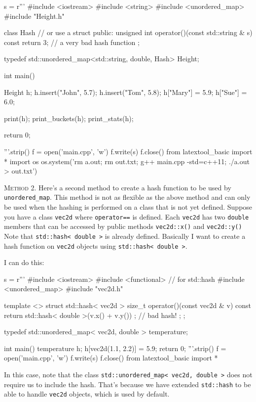 \begin{python}
s = r'''
#include <iostream>
#include <string>
#include <unordered_map>
#include "Height.h"

class Hash // or use a struct
{
public:
    unsigned int operator()(const std::string & s) const
    {
        return 3; // a very bad hash function
    }
};

typedef std::unordered_map<std::string, double, Hash> Height;

int main()
{
    Height h;
    h.insert({"John", 5.7});
    h.insert({"Tom", 5.8});
    h["Mary"] = 5.9;
    h["Sue"] = 6.0;

    print(h);
    print_buckets(h);
    print_stats(h);
              
    return 0;
}
'''.strip()
f = open('main.cpp', 'w')
f.write(s)
f.close()
from latextool_basic import *
import os
os.system('rm a.out; rm out.txt; g++ main.cpp -std=c++11; ./a.out > out.txt')
\end{python}
\vspace{-0.1cm}
{\small
{}
}

\textsc{Method 2.}
Here's a second method to create a hash function to be used
by \verb!unordered_map!.
This method is not as flexible as the above method
and can only be used when the hashing is performed
on a class that is not yet defined.
Suppose you have a class \verb!vec2d!
where \verb!operator==! is defined.
Each \verb!vec2d! has two \verb!double! members
that can be accessed by public methods
\verb!vec2d::x()! and
\verb!vec2d::y()!
Note that \verb!std::hash< double >! is already defined.
Basically I want to create a hash function on \verb!vec2d! objects
using \verb!std::hash< double >!.

I can do this:
\begin{python}
s = r'''
#include <iostream>
#include <functional> // for std::hash
#include <unordered_map>
#include "vec2d.h"

template <>
struct std::hash< vec2d >
{
    size_t operator()(const vec2d & v) const
    {
        return std::hash< double >{}(v.x() + v.y()) ; // bad hash!
    };
};

typedef std::unordered_map< vec2d, double > temperature;

int main()
{
    temperature h;
    h[vec2d(1.1, 2.2)] = 5.9;
    return 0;
}
'''.strip()
f = open('main.cpp', 'w')
f.write(s)
f.close()
from latextool_basic import *
\end{python}
\vspace{-0.1cm}
{\small
{}
}
In this case, note that the class
\verb!std::unordered_map< vec2d, double >!
does not require us to include the hash.
That's because we have extended \verb!std::hash!
to be able to handle \verb!vec2d! objects,
which is used by default.

